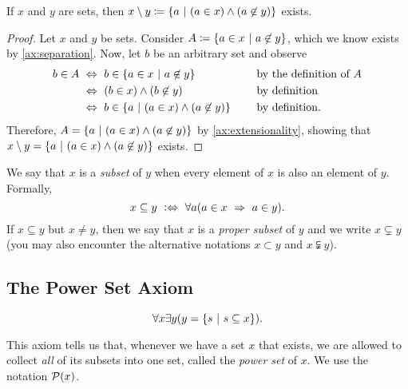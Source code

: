 \begin{theorem}
    If \(x\) and \(y\) are sets,
    then \(x \setminus y \defn \set*{a \suchthat (a \in x) \meet (a \not \in y)}\) exists.
\end{theorem}
\begin{proof}
    Let \(x\) and \(y\) be sets.
    Consider \(A \defn \set*{a \in x \suchthat a \not \in y}\),
    which we know exists by \autoref{ax:separation}.
    Now, let \(b\) be an arbitrary set and observe
    \begin{alignat*}{2}
        b \in A &\iff b \in \set*{a \in x \suchthat a \not \in y} &&\text{by the definition of \(A\)} \\
                &\iff \pn*{b \in x} \meet \pn*{b \not \in y} &&\text{by definition} \\
                &\iff b \in \set*{a \suchthat \pn*{a \in x} \meet \pn*{a \not \in y}}~~~~&&\text{by definition}.
    \end{alignat*}
    Therefore, \(A = \set*{a \suchthat \pn*{a \in x} \meet \pn*{a \not \in y}}\) by \autoref{ax:extensionality},
    showing that \(x \setminus y = \set*{a \suchthat \pn*{a \in x} \meet \pn*{a \not \in y}}\) exists.
\end{proof}

\begin{definition}[Subsets]
    We say that \(x\) is a \emph{subset} of \(y\) when every element of \(x\) is also an element of \(y\).
    Formally,
    \[
        x \subseteq y \iffdefn \forall a \pn*{a \in x \implies a \in y}.
    \]
    If \(x \subseteq y\) but \(x \neq y\),
    then we say that \(x\) is a \emph{proper subset} of \(y\) and we write \(x \subsetneq y\)
    (you may also encounter the alternative notations \(x \subset y\) and \(x \subsetneqq y\)).
\end{definition}

\subsection{The Power Set Axiom}
\begin{axiom}
    \[
        \forall x \exists y \pn*{y = \set*{s \suchthat s \subseteq x}}.
    \]

    This axiom tells us that, whenever we have a set \(x\) that exists,
    we are allowed to collect \emph{all} of its subsets into one set, called the \emph{power set} of \(x\).
    We use the notation \(\power{x}\).
\end{axiom}

